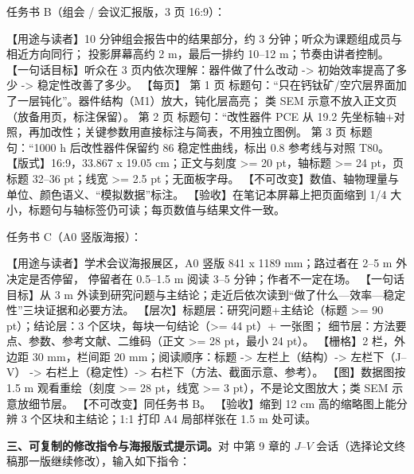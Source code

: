 任务书 B（组会 / 会议汇报版，3 页 16:9）：
\begin{Prompt}
【用途与读者】10 分钟组会报告中的结果部分，约 3 分钟；听众为课题组成员与相近方向同行；
投影屏幕高约 2 m，最后一排约 10–12 m；节奏由讲者控制。
【一句话目标】听众在 3 页内依次理解：器件做了什么改动 -> 初始效率提高了多少 -> 稳定性改善了多少。
【每页】
  第 1 页 标题句：“只在钙钛矿/空穴层界面加了一层钝化”。器件结构（M1）放大，钝化层高亮；
          类 SEM 示意不放入正文页（放备用页，标注保留）。
  第 2 页 标题句：“改性器件 PCE 从 19.2 %
          先坐标轴+对照，再加改性；关键参数用直接标注与简表，不用独立图例。
  第 3 页 标题句：“1000 h 后改性器件保留约 86 %
          稳定性曲线，标出 0.8 参考线与对照 T80。
【版式】16:9，33.867 x 19.05 cm；正文与刻度 >= 20 pt，轴标题 >= 24 pt，页标题 32–36 pt；线宽 >= 2.5 pt；无面板字母。
【不可改变】数值、轴物理量与单位、颜色语义、“模拟数据”标注。
【验收】在笔记本屏幕上把页面缩到 1/4 大小，标题句与轴标签仍可读；每页数值与结果文件一致。
\end{Prompt}

任务书 C（A0 竖版海报）：
\begin{Prompt}
【用途与读者】学术会议海报展区，A0 竖版 841 x 1189 mm；路过者在 2–5 m 外决定是否停留，
停留者在 0.5–1.5 m 阅读 3–5 分钟；作者不一定在场。
【一句话目标】从 3 m 外读到研究问题与主结论；走近后依次读到“做了什么—效率—稳定性”三块证据和必要方法。
【层次】标题层：研究问题+主结论（标题 >= 90 pt）；结论层：3 个区块，每块一句结论（>= 44 pt）+ 一张图；
细节层：方法要点、参数、参考文献、二维码（正文 >= 28 pt，最小 24 pt）。
【栅格】2 栏，外边距 30 mm，栏间距 20 mm；阅读顺序：标题 -> 左栏上（结构）-> 左栏下（J–V）
-> 右栏上（稳定性）-> 右栏下（方法、截面示意、参考）。
【图】数据图按 1.5 m 观看重绘（刻度 >= 28 pt，线宽 >= 3 pt），不是论文图放大；类 SEM 示意放细节层。
【不可改变】同任务书 B。
【验收】缩到 12 cm 高的缩略图上能分辨 3 个区块和主结论；1:1 打印 A4 局部样张在 1.5 m 处可读。
\end{Prompt}

\textbf{三、可复制的修改指令与海报版式提示词。}对  中第 9 章的 $J\text{--}V$ 会话（选择论文终稿那一版继续修改），输入如下指令：


